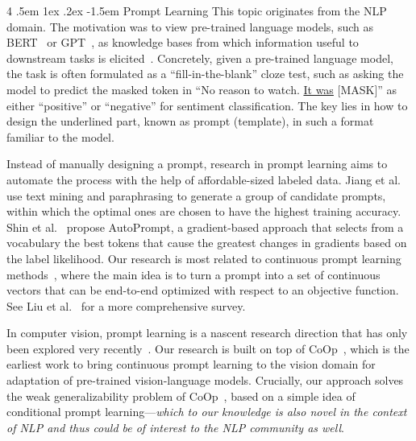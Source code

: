 \documentclass[10pt,twocolumn,letterpaper]{article}
\makeatletter
\renewcommand\paragraph{
  \@startsection{paragraph} {4} {\z@} {.5em \@plus1ex \@minus.2ex} {-1.5em} {\normalfont\normalsize\bfseries} }
\makeatother
\begin{document}
\paragraph{Prompt Learning}
This topic originates from the NLP domain. The motivation was to view pre-trained language models, such as BERT~\cite{devlin2019bert} or GPT~\cite{radford2019language}, as knowledge bases from which information useful to downstream tasks is elicited~\cite{petroni2019language}. Concretely, given a pre-trained language model, the task is often formulated as a ``fill-in-the-blank'' cloze test, such as asking the model to predict the masked token in ``No reason to watch. \underline{It was} [MASK]'' as either ``positive'' or ``negative'' for sentiment classification. The key lies in how to design the underlined part, known as prompt (template), in such a format familiar to the model.

Instead of manually designing a prompt, research in prompt learning aims to automate the process with the help of affordable-sized labeled data. Jiang et al.~\cite{jiang2020can} use text mining and paraphrasing to generate a group of candidate prompts, within which the optimal ones are chosen to have the highest training accuracy. Shin et al.~\cite{shin2020autoprompt} propose AutoPrompt, a gradient-based approach that selects from a vocabulary the best tokens that cause the greatest changes in gradients based on the label likelihood. Our research is most related to continuous prompt learning methods~\cite{zhong2021factual,li2021prefix,lester2021power}, where the main idea is to turn a prompt into a set of continuous vectors that can be end-to-end optimized with respect to an objective function. See Liu et al.~\cite{liu2021pre} for a more comprehensive survey.

In computer vision, prompt learning is a nascent research direction that has only been explored very recently~\cite{zhou2021coop,yao2021cpt,rao2022denseclip,ju2021prompting,zhang2021pointclip}. Our research is built on top of CoOp~\cite{zhou2021coop}, which is the earliest work to bring continuous prompt learning to the vision domain for adaptation of pre-trained vision-language models. Crucially, our approach solves the weak generalizability problem of CoOp~\cite{zhou2021coop}, based on a simple idea of conditional prompt learning---\emph{which to our knowledge is also novel in the context of NLP and thus could be of interest to the NLP community as well}.
\end{document}
